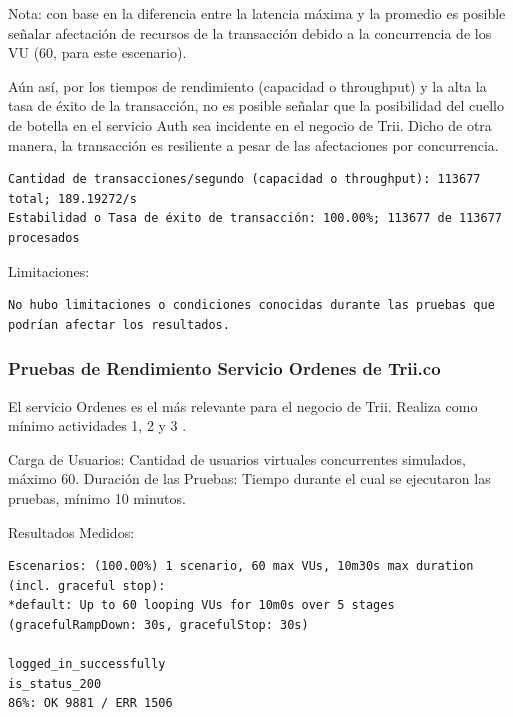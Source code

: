 \documentclass[
  paper=a4,
  ,captions=tableheading
]{scrartcl}
\begin{document}
Nota: con base en la diferencia entre la latencia máxima y la promedio
es posible señalar afectación de recursos de la transacción debido a la
concurrencia de los VU (60, para este escenario).

Aún así, por los tiempos de rendimiento (capacidad o throughput) y la
alta la tasa de éxito de la transacción, no es posible señalar que la
posibilidad del cuello de botella en el servicio Auth sea incidente en
el negocio de Trii. Dicho de otra manera, la transacción es resiliente a
pesar de las afectaciones por concurrencia.

\begin{verbatim}
Cantidad de transacciones/segundo (capacidad o throughput): 113677 total; 189.19272/s
Estabilidad o Tasa de éxito de transacción: 100.00%; 113677 de 113677 procesados
\end{verbatim}

Limitaciones:

\begin{verbatim}
No hubo limitaciones o condiciones conocidas durante las pruebas que podrían afectar los resultados.
\end{verbatim}

\subsubsection{Pruebas de Rendimiento Servicio Ordenes de
Trii.co}\label{sec:pruebas-de-rendimiento-servicio-ordenes-de-trii.co}

El servicio Ordenes es el más relevante para el negocio de Trii. Realiza
como mínimo actividades 1, 2 y 3 .

Carga de Usuarios: Cantidad de usuarios virtuales concurrentes
simulados, máximo 60. Duración de las Pruebas: Tiempo durante el cual se
ejecutaron las pruebas, mínimo 10 minutos.

Resultados Medidos:

\begin{verbatim}
Escenarios: (100.00%) 1 scenario, 60 max VUs, 10m30s max duration (incl. graceful stop):
*default: Up to 60 looping VUs for 10m0s over 5 stages (gracefulRampDown: 30s, gracefulStop: 30s)

logged_in_successfully
is_status_200
86%: OK 9881 / ERR 1506
\end{verbatim}
\end{document}
